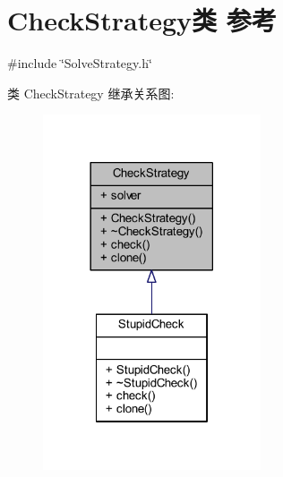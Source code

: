 \hypertarget{classCheckStrategy}{}\section{Check\+Strategy类 参考}
\label{classCheckStrategy}


{\ttfamily \#include \char`\"{}Solve\+Strategy.\+h\char`\"{}}



类 Check\+Strategy 继承关系图\+:
\nopagebreak
\begin{figure}[H]
\begin{center}
\leavevmode
\includegraphics[width=182pt]{classCheckStrategy__inherit__graph}
\end{center}
\end{figure}


